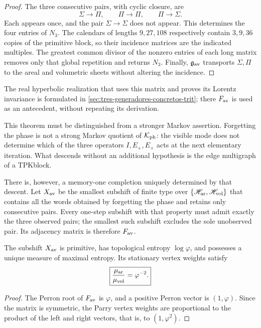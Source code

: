 \begin{proof}
The three consecutive pairs, with cyclic closure, are
\[
 \Sigma\longrightarrow\Pi,\qquad
 \Pi\longrightarrow\Pi,\qquad
 \Pi\longrightarrow\Sigma.
\]
Each appears once, and the pair \(\Sigma\to\Sigma\) does not appear. This determines the four entries of \(N_3\). The calendars of lengths \(9,27,108\) respectively contain \(3,9,36\) copies of the primitive block, so their incidence matrices are the indicated multiples. The greatest common divisor of the nonzero entries of each long matrix removes only that global repetition and returns \(N_3\). Finally, \(\mathfrak g_{\rm av}\) transports \(\Sigma,\Pi\) to the areal and volumetric sheets without altering the incidence.
\end{proof}

The real hyperbolic realization that uses this matrix and proves its
Lorentz invariance is formulated in
\cref{sec:tres-generadores-concretos-trit}; there \(F_{\rm av}\) is used
as an antecedent, without repeating its derivation.

This theorem must be distinguished from a stronger Markov assertion.
Forgetting the phase is not a strong Markov quotient of
\(\mathcal K_{\rm ph}\): the visible mode does not determine which of the three
operators \(I,E_+,E_\times\) acts at the next elementary iteration. What descends
without an additional hypothesis is the edge multigraph of a TPK\@ block.

There is, however, a memory-one completion uniquely determined by that descent. Let \(X_{\rm av}\) be the smallest subshift of finite type over \(\{\mathscr H_{\rm ar},\mathscr H_{\rm vol}\}\) that contains all the words obtained by forgetting the phase and retains only consecutive pairs. Every one-step subshift with that property must admit exactly the three observed pairs; the smallest such subshift excludes the sole unobserved pair. Its adjacency matrix is therefore \(F_{\rm av}\).

\begin{corollary}
\label{cor:parry-envolvente-fav}
The subshift \(X_{\rm av}\) is primitive, has topological entropy
\(\log\varphi\), and possesses a unique measure of maximal entropy. Its stationary
vertex weights satisfy
\[
 \boxed{
 \frac{\mu_{\rm ar}}{\mu_{\rm vol}}=\varphi^{-2}.}
\]
\end{corollary}

\begin{proof}
The Perron root of \(F_{\rm av}\) is \(\varphi\), and a positive Perron
vector is \((1,\varphi)\). Since the matrix is symmetric, the Parry vertex
weights are proportional to the product of the left and right vectors,
that is, to \((1,\varphi^2)\).
\end{proof}

